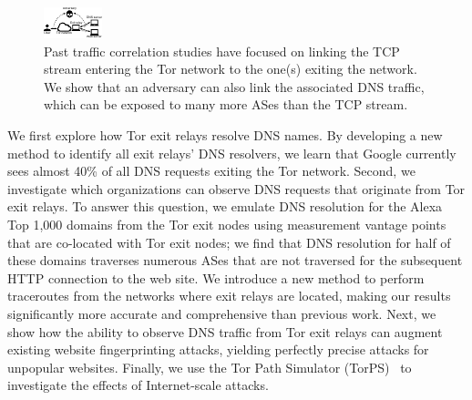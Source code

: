 \begin{figure}[t]
	\centering
	\includegraphics[width=0.65\linewidth]{figures/attack-concept.pdf}
	\caption{Past traffic correlation studies have focused on linking the TCP
		stream entering the Tor network to the one(s) exiting the network.  We
		show that an adversary can also link the associated DNS traffic, which
		can be exposed to many more ASes than the TCP stream.}
	\label{fig:overview}
\end{figure}

We first explore how Tor exit relays resolve DNS names.  By developing a
new method to identify all exit relays' DNS resolvers, we learn that Google
currently sees almost 40\% of all DNS requests exiting the Tor network.
Second, we investigate which organizations can observe
DNS requests that originate from Tor exit relays.  To answer this question, we emulate DNS
resolution for the Alexa Top 1,000 domains from the Tor exit nodes using
measurement vantage points that are co-located with Tor exit nodes; we find that DNS
resolution for half of these domains traverses numerous ASes
that are not traversed for the subsequent HTTP connection to the web
site.
We introduce a new
method to perform traceroutes from the networks where
exit relays are located, making our results significantly more accurate and
comprehensive than previous work.
Next, we show how the ability to observe DNS traffic from Tor
exit relays can
augment existing website fingerprinting attacks,
yielding perfectly precise \name attacks for unpopular websites.
Finally, we use the Tor Path Simulator (TorPS)~\cite{TorPS} to investigate the
effects of Internet-scale \name attacks.

